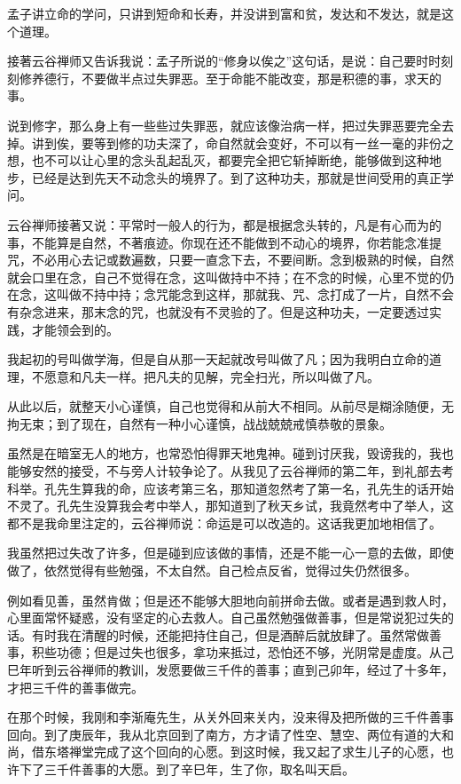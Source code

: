 \documentclass[12pt,twoside,openany]{book}
\begin{document}
孟子讲立命的学问，只讲到短命和长寿，并没讲到富和贫，发达和不发达，就是这个道理。

接著云谷禅师又告诉我说：孟子所说的“修身以俟之”这句话，是说：自己要时时刻刻修养德行，不要做半点过失罪恶。至于命能不能改变，那是积德的事，求天的事。

说到修字，那么身上有一些些过失罪恶，就应该像治病一样，把过失罪恶要完全去掉。讲到俟，要等到修的功夫深了，命自然就会变好，不可以有一丝一毫的非份之想，也不可以让心里的念头乱起乱灭，都要完全把它斩掉断绝，能够做到这种地步，已经是达到先天不动念头的境界了。到了这种功夫，那就是世间受用的真正学问。

云谷禅师接著又说：平常时一般人的行为，都是根据念头转的，凡是有心而为的事，不能算是自然，不著痕迹。你现在还不能做到不动心的境界，你若能念准提咒，不必用心去记或数遍数，只要一直念下去，不要间断。念到极熟的时候，自然就会口里在念，自己不觉得在念，这叫做持中不持；在不念的时候，心里不觉的仍在念，这叫做不持中持；念咒能念到这样，那就我、咒、念打成了一片，自然不会有杂念进来，那末念的咒，也就没有不灵验的了。但是这种功夫，一定要透过实践，才能领会到的。

我起初的号叫做学海，但是自从那一天起就改号叫做了凡；因为我明白立命的道理，不愿意和凡夫一样。把凡夫的见解，完全扫光，所以叫做了凡。

从此以后，就整天小心谨慎，自己也觉得和从前大不相同。从前尽是糊涂随便，无拘无束；到了现在，自然有一种小心谨慎，战战兢兢戒慎恭敬的景象。

虽然是在暗室无人的地方，也常恐怕得罪天地鬼神。碰到讨厌我，毁谤我的，我也能够安然的接受，不与旁人计较争论了。从我见了云谷禅师的第二年，到礼部去考科举。孔先生算我的命，应该考第三名，那知道忽然考了第一名，孔先生的话开始不灵了。孔先生没算我会考中举人，那知道到了秋天乡试，我竟然考中了举人，这都不是我命里注定的，云谷禅师说：命运是可以改造的。这话我更加地相信了。

我虽然把过失改了许多，但是碰到应该做的事情，还是不能一心一意的去做，即使做了，依然觉得有些勉强，不太自然。自己检点反省，觉得过失仍然很多。

例如看见善，虽然肯做；但是还不能够大胆地向前拼命去做。或者是遇到救人时，心里面常怀疑惑，没有坚定的心去救人。自己虽然勉强做善事，但是常说犯过失的话。有时我在清醒的时候，还能把持住自己，但是酒醉后就放肆了。虽然常做善事，积些功德；但是过失也很多，拿功来抵过，恐怕还不够，光阴常是虚度。从己巳年听到云谷禅师的教训，发愿要做三千件的善事；直到己卯年，经过了十多年，才把三千件的善事做完。

在那个时候，我刚和李渐庵先生，从关外回来关内，没来得及把所做的三千件善事回向。到了庚辰年，我从北京回到了南方，方才请了性空、慧空、两位有道的大和尚，借东塔禅堂完成了这个回向的心愿。到这时候，我又起了求生儿子的心愿，也许下了三千件善事的大愿。到了辛巳年，生了你，取名叫天启。
\end{document}
